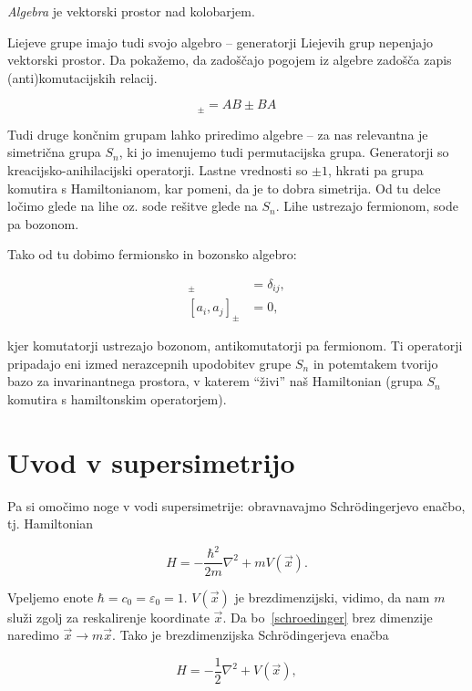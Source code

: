 \emph{Algebra} je vektorski prostor nad kolobarjem.

Liejeve grupe imajo tudi svojo algebro -- generatorji Liejevih grup nepenjajo vektorski
prostor. Da poka\v zemo, da zado\v s\v cajo pogojem iz algebre zado\v s\v ca zapis (anti)komutacijskih
relacij.

\begin{equation}
	[A,B]_\pm = AB \pm BA
\end{equation}

Tudi druge kon\v cnim grupam lahko priredimo algebre -- za nas relevantna je simetri\v cna grupa
$S_n$, ki jo imenujemo tudi permutacijska grupa. Generatorji so kreacijsko-anihilacijski
operatorji. Lastne vrednosti so $\pm 1$, hkrati pa grupa komutira s Hamiltonianom, kar pomeni,
da je to dobra simetrija. Od tu delce lo\v cimo glede na lihe oz. sode re\v sitve glede na $S_n$. 
Lihe ustrezajo fermionom, sode pa bozonom. 

Tako od tu dobimo fermionsko in bozonsko algebro:

\begin{align}
	[a_i, a_j^\dagger]_\pm &= \delta_{ij}, \\
	[a_i, a_j]_\pm &= 0,
\end{align}

kjer komutatorji ustrezajo bozonom, antikomutatorji pa fermionom. Ti operatorji pripadajo eni izmed
nerazcepnih upodobitev grupe $S_n$ in potemtakem tvorijo bazo za invarinantnega prostora, v katerem
"`\v zivi"' na\v s Hamiltonian (grupa $S_n$ komutira s hamiltonskim operatorjem).

\section{Uvod v supersimetrijo}

Pa si omo\v cimo noge v vodi supersimetrije: obravnavajmo Schr\" odingerjevo ena\v cbo, tj. Hamiltonian

\begin{equation}
	H = -\frac{\hbar^2}{2m}\nabla^2 + mV(\vec{x}).
	\label{schroedinger}
\end{equation}

Vpeljemo enote $\hbar = c_0 = \varepsilon_0 = 1$. $V(\vec{x})$ je brezdimenzijski, vidimo, da
nam $m$ slu\v zi zgolj za reskalirenje koordinate $\vec{x}$. Da bo~\eqref{schroedinger} brez
dimenzije naredimo $\vec{x} \to m\vec{x}$. Tako je brezdimenzijska Schr\" odingerjeva ena\v cba

\begin{equation}
	H = -\frac{1}{2}\nabla^2 + V(\vec{x}),
	\label{s1}
\end{equation}

